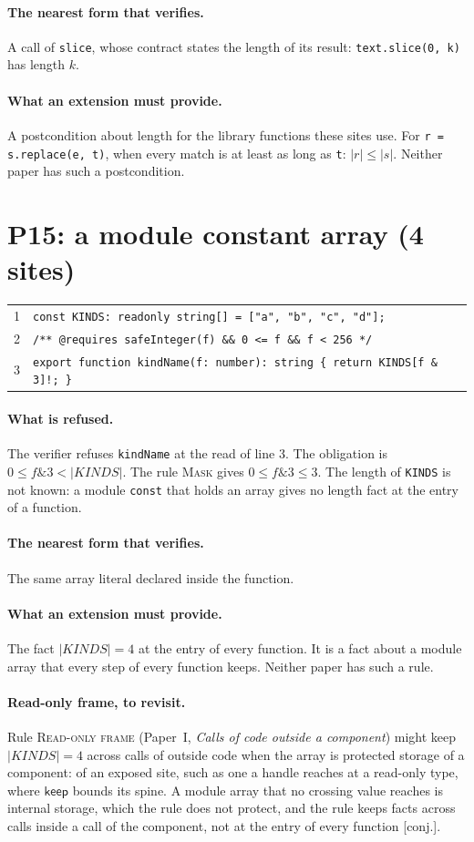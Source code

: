 \documentclass[10pt,a4paper]{article}
\theoremstyle{definition}
\theoremstyle{remark}
\newcommand{\kw}[1]{\mathsf{#1}}
\newcommand{\keep}{\kw{keep}}
\newcommand{\len}[1]{|#1|}
\newcommand{\code}[1]{\texttt{#1}}
\newcommand{\status}[1]{\textsf{\small[#1]}}
\newcommand{\nI}[1]{Paper~I, \emph{#1}}
\newcommand{\entry}[1]{\paragraph{#1.}}
\begin{document}
\entry{The nearest form that verifies} A call of \code{slice}, whose contract states the length
of its result: \code{text.slice(0, k)} has length $k$.

\entry{What an extension must provide} A postcondition about length for the library functions
these sites use. For \code{r = s.replace(e, t)}, when every match is
at least as long as \code{t}: $\len{r}\le\len{s}$. Neither paper has
such a postcondition.

\section{P15: a module constant array (4 sites)}

{\footnotesize
\begin{tabular}{@{}r@{\hspace{1em}}l@{}}
1 & \code{const KINDS: readonly string[] = ["a", "b", "c", "d"];} \\
2 & \code{/** @requires safeInteger(f) \&\& 0 <= f \&\& f < 256 */} \\
3 & \code{export function kindName(f: number): string \{ return KINDS[f \& 3]!; \}} \\
\end{tabular}}

\entry{What is refused} The verifier refuses \code{kindName} at the read of
line 3. The obligation is
$0\le f\mathbin{\&}3<\len{\mathit{KINDS}}$. The rule \textsc{Mask}
gives $0\le f\mathbin{\&}3\le3$. The length of \code{KINDS} is not
known: a module \code{const} that holds an array gives no length fact
at the entry of a function.

\entry{The nearest form that verifies} The same array literal declared inside the function.

\entry{What an extension must provide} The fact $\len{\mathit{KINDS}}=4$ at the entry of every
function. It is a fact about a module array that every step of every
function keeps. Neither paper has such a rule.

\entry{Read-only frame, to revisit} Rule \textsc{Read-only frame}
(\nI{Calls of code outside a component}) might keep
$\len{\mathit{KINDS}}=4$ across calls of outside code when the array is
protected storage of a component: of an exposed site, such as one a
handle reaches at a read-only type, where $\keep$ bounds its spine. A
module array that no crossing value reaches is internal storage, which
the rule does not protect, and the rule keeps facts across calls inside
a call of the component, not at the entry of every function
\status{conj.}.
\end{document}
